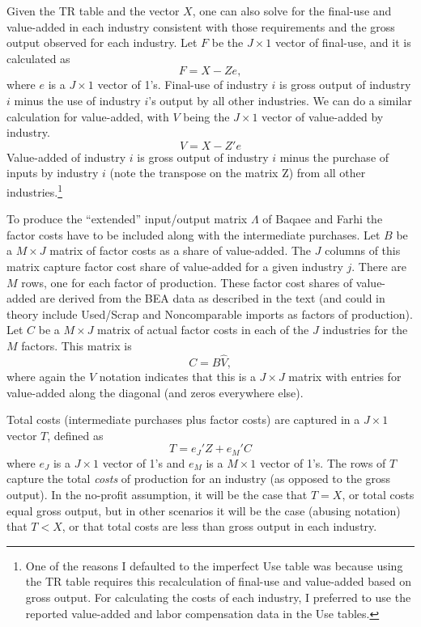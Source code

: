Given the TR table and the vector $X$, one can also solve for the final-use and value-added in each industry consistent with those requirements and the gross output observed for each industry. Let $F$ be the $J\times 1$ vector of final-use, and it is calculated as
\begin{equation}
	F = X - Ze,
\end{equation}
where $e$ is a $J\times 1$ vector of 1's. Final-use of industry $i$ is gross output of industry $i$ minus the use of industry $i$'s output by all other industries. We can do a similar calculation for value-added, with $V$ being the $J\times 1$ vector of value-added by industry. 
\begin{equation}
	V = X - Z'e
\end{equation}
Value-added of industry $i$ is gross output of industry $i$ minus the purchase of inputs by industry $i$ (note the transpose on the matrix Z) from all other industries.\footnote{One of the reasons I defaulted to the imperfect Use table was because using the TR table requires this recalculation of final-use and value-added based on gross output. For calculating the costs of each industry, I preferred to use the reported value-added and labor compensation data in the Use tables.} 

To produce the ``extended'' input/output matrix $\Lambda$ of Baqaee and Farhi the factor costs have to be included along with the intermediate purchases. Let $B$ be a $M\times J$ matrix of factor costs as a share of value-added. The $J$ columns of this matrix capture factor cost share of value-added for a given industry $j$. There are $M$ rows, one for each factor of production. These factor cost shares of value-added are derived from the BEA data as described in the text (and could in theory include Used/Scrap and Noncomparable imports as factors of production). Let $C$ be a $M\times J$ matrix of actual factor costs in each of the $J$ industries for the $M$ factors. This matrix is
\begin{equation}
	C = B\hat{V},
\end{equation}
where again the $\hat{V}$ notation indicates that this is a $J\times J$ matrix with entries for value-added along the diagonal (and zeros everywhere else). 

Total costs (intermediate purchases plus factor costs) are captured in a $J\times 1$ vector $T$, defined as
\begin{equation}
	T = e_J'Z + e_M'C
\end{equation}
where $e_J$ is a $J\times 1$ vector of 1's and $e_M$ is a $M\times 1$ vector of 1's. The rows of $T$ capture the total \textit{costs} of production for an industry (as opposed to the gross output). In the no-profit assumption, it will be the case that $T = X$, or total costs equal gross output, but in other scenarios it will be the case (abusing notation) that $T < X$, or that total costs are less than gross output in each industry. 

